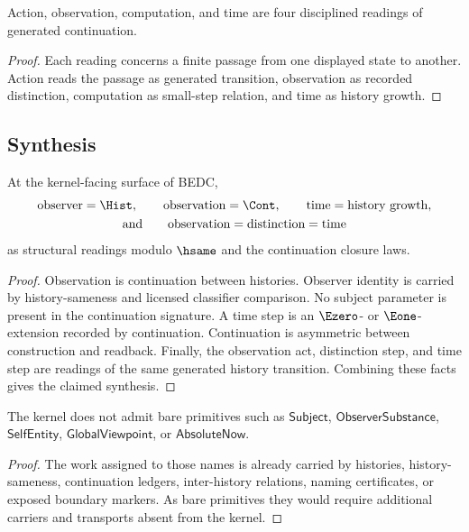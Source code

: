 \begin{corollary}
\label{cor:philosophy-action-observation-computation-time-cohere}
Action, observation, computation, and time are four disciplined readings
of generated continuation.
\end{corollary}
\begin{proof}
Each reading concerns a finite passage from one displayed state to
another. Action reads the passage as generated transition, observation
as recorded distinction, computation as small-step relation, and time
as history growth.
\end{proof}

\subsection{Synthesis}
\label{subsec:philosophy-observation-subject-time-synthesis}

\begin{theorem}
\label{thm:philosophy-observer-observation-time-synthesis}
At the kernel-facing surface of BEDC,
$$
\begin{gathered}
\text{observer}=\Hist,\qquad
\text{observation}=\Cont,\qquad
\text{time}=\text{history growth},
\\
\text{and}\qquad
\text{observation}=\text{distinction}=\text{time}
\end{gathered}
$$
as structural readings modulo \(\hsame\) and the continuation closure
laws.
\end{theorem}
\begin{proof}
Observation is continuation between histories. Observer identity is
carried by history-sameness and licensed classifier comparison. No
subject parameter is present in the continuation signature. A time step
is an \(\Ezero\)- or \(\Eone\)-extension recorded by continuation.
Continuation is asymmetric between construction and readback. Finally,
the observation act, distinction step, and time step are readings of the
same generated history transition. Combining these facts gives the
claimed synthesis.
\end{proof}

\begin{corollary}
\label{cor:philosophy-excluded-subject-primitives}
The kernel does not admit bare primitives such as
\(\mathsf{Subject}\), \(\mathsf{ObserverSubstance}\),
\(\mathsf{SelfEntity}\), \(\mathsf{GlobalViewpoint}\), or
\(\mathsf{AbsoluteNow}\).
\end{corollary}
\begin{proof}
The work assigned to those names is already carried by histories,
history-sameness, continuation ledgers, inter-history relations, naming
certificates, or exposed boundary markers. As bare primitives they
would require additional carriers and transports absent from the
kernel.
\end{proof}

